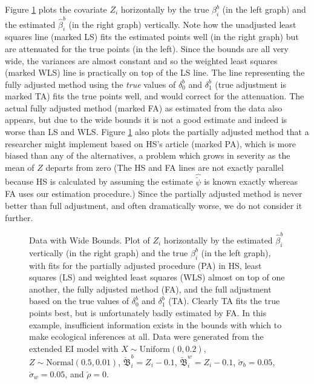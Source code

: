 \documentclass[11pt,titlepage]{article}
\newcommand{\bbeta}{{\mathfrak B}}
\newcommand{\sigmau}{\breve{\sigma}}
\newcommand{\rhou}{\breve{\rho}}
\newcommand{\psiu}{\breve{\psi}}
\begin{document}
Figure \ref{f:wide} plots the covariate $Z_i$ horizontally by the true
$\beta_i^b$ (in the left graph) and the estimated $\hat\beta_i^b$ (in
the right graph) vertically.  Note how the unadjusted least squares
line (marked LS) fits the estimated points well (in the right graph)
but are attenuated for the true points (in the left).  Since the
bounds are all very wide, the variances are almost constant and so the
weighted least squares (marked WLS) line is practically on top of the
LS line.  The line representing the fully adjusted method using the
\emph{true} values of $\delta_0^b$ and $\delta_1^b$ (true adjustment
is marked TA) fits the true points well, and would correct for the
attenuation.  The actual fully adjusted method (marked FA) as
estimated from the data also appears, but due to the wide bounds it is
not a good estimate and indeed is worse than LS and WLS.  Figure
\ref{f:wide} also plots the partially adjusted method that a
researcher might implement based on HS's article (marked PA), which is
more biased than any of the alternatives, a problem which grows in
severity as the mean of $Z$ departs from zero (The HS and FA lines are
not exactly parallel because HS is calculated by assuming the estimate
$\hat\psiu$ is known exactly whereas FA uses our estimation
procedure.)  Since the partially adjusted method is never better than
full adjustment, and often dramatically worse, we do not consider it
further.
\begin{figure}[t]
  \begin{center}
    \caption{Data with Wide Bounds. Plot of $Z_i$ horizontally by
      the estimated $\hat\beta_i^b$ vertically (in the right graph)
      and the true $\beta_i^b$ (in the left graph), with fits for the
      partially adjusted procedure (PA) in HS, least squares (LS) and
      weighted least squares (WLS) almost on top of one another, the
      fully adjusted method (FA), and the full adjustment based on the
      true values of $\delta_0^b$ and $\delta_1^b$ (TA).  Clearly TA
      fits the true points best, but is unfortunately badly estimated
      by FA.  In this example, insufficient information exists in the
      bounds with which to make ecological inferences at all.  Data
      were generated from the extended EI model with $X \sim
      \textrm{Uniform}(0,0.2)$, $Z \sim \textrm{Normal}(0.5,0.01)$,
      $\breve\bbeta_i^b = Z_i - 0.1$, $\breve\bbeta_i^w = Z_i - 0.1$,
      $\sigmau_b = 0.05$, $\sigmau_w = 0.05$, and $\rhou = 0$.}
    \label{f:wide}
  \end{center}
\end{figure}
\end{document}
